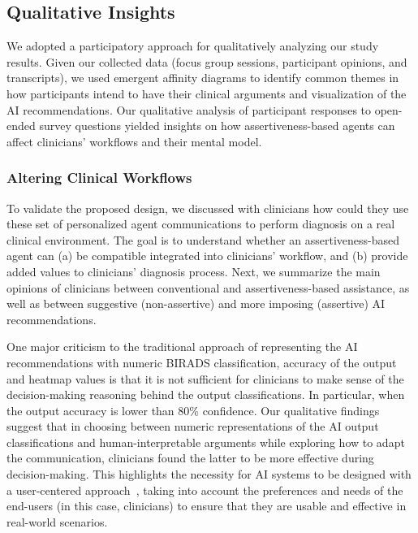 \subsection{Qualitative Insights}
\label{sec:chap006006003}

We adopted a participatory approach for qualitatively analyzing our study results.
Given our collected data (focus group sessions, participant opinions, and transcripts), we used emergent affinity diagrams to identify common themes in how participants intend to have their clinical arguments and visualization of the AI recommendations.
Our qualitative analysis of participant responses to open-ended survey questions yielded insights on how assertiveness-based agents can affect clinicians’ workflows and their mental model.

\subsubsection{Altering Clinical Workflows}
\label{sec:chap006006003001}

To validate the proposed design, we discussed with clinicians how could they use these set of personalized agent communications to perform diagnosis on a real clinical environment.
The goal is to understand whether an assertiveness-based agent can (a) be compatible integrated into clinicians' workflow, and (b) provide added values to clinicians' diagnosis process.
Next, we summarize the main opinions of clinicians between conventional and assertiveness-based assistance, as well as between suggestive (non-assertive) and more imposing (assertive) AI recommendations.

One major criticism to the traditional approach of representing the AI recommendations with numeric BIRADS classification, accuracy of the output and heatmap values is that it is not sufficient for clinicians to make sense of the decision-making reasoning behind the output classifications.
In particular, when the output accuracy is lower than 80\% confidence.
Our qualitative findings suggest that in choosing between numeric representations of the AI output classifications and human-interpretable arguments while exploring how to adapt the communication, clinicians found the latter to be more effective during decision-making.
This highlights the necessity for AI systems to be designed with a user-centered approach~\cite{10.1145/3491102.3517789, Zimmerman2014}, taking into account the preferences and needs of the end-users (in this case, clinicians) to ensure that they are usable and effective in real-world scenarios.

